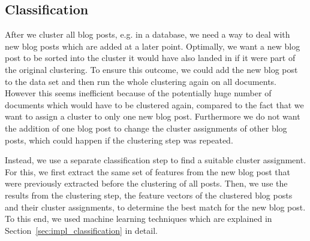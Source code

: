 
\subsection{Classification}
\label{sec:classification}



After we cluster all blog posts, e.g. in a database, we need a way to deal with new blog posts which are added at a later point.
Optimally, we want a new blog post to be sorted into the cluster it would have also landed in if it were part of the original clustering.
To ensure this outcome, we could add the new blog post to the data set and then run the whole clustering again on all documents.
However this seems inefficient because of the potentially huge number of documents which would have to be clustered again, compared to the fact that we want to assign a cluster to only one new blog post.
Furthermore we do not want the addition of one blog post to change the cluster assignments of other blog posts, which could happen if the clustering step was repeated.


Instead, we use a separate classification step to find a suitable cluster assignment.
For this, we first extract the same set of features from the new blog post that were previously extracted before the clustering of all posts.
Then, we use the results from the clustering step, the feature vectors of the clustered blog posts and their cluster assignments, to determine the best match for the new blog post.
To this end, we used machine learning techniques which are explained in Section~\ref{sec:impl_classification} in detail.
